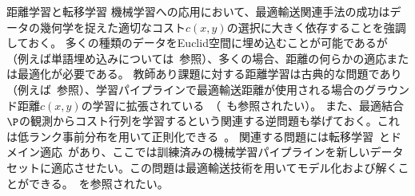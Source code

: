 \begin{rem1}{距離学習と転移学習}
	機械学習への応用において、最適輸送関連手法の成功はデータの幾何学を捉えた適切なコスト$c(x,y)$の選択に大きく依存することを強調しておく。
	多くの種類のデータをEuclid空間に埋め込むことが可能であるが（例えば単語埋め込みについては~\citep{mikolov2013efficient}参照）、多くの場合、距離の何らかの適応または最適化が必要である。
	教師あり課題に対する距離学習は古典的な問題であり（例えば~\citep{MAL-019,weinberger2009distance}参照）、学習パイプラインで最適輸送距離が使用される場合のグラウンド距離$c(x,y)$の学習に拡張されている~\citep{CuturiGroundMetric2014}（~\citealt{ZenICPR14,WangECCV12OLD,huang2016supervised}も参照されたい）。
	また、最適結合$\P$の観測からコスト行列を学習するという関連する逆問題も挙げておく。これは低ランク事前分布を用いて正則化できる~\citep{dupuy2016estimating}。
	関連する問題には転移学習~\citep{pan2010survey}とドメイン適応~\citep{glorot2011domain}があり、ここでは訓練済みの機械学習パイプラインを新しいデータセットに適応させたい。この問題は最適輸送技術を用いてモデル化および解くことができる。~\citep{courty2017optimal,courty2017joint}を参照されたい。
\end{rem1}
